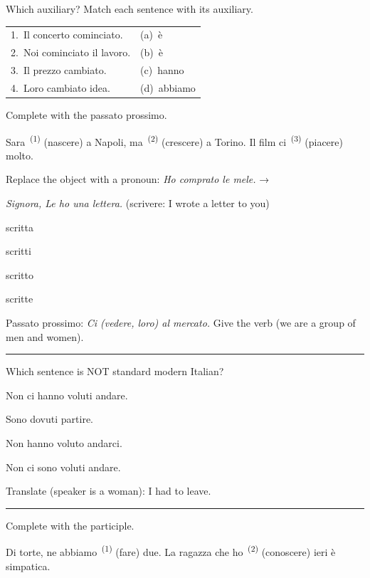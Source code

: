 \documentclass[11pt,a4paper,twoside,openright]{book}
\newcommand{\blank}{\underline{\hspace{2.6cm}}}
\newcommand{\clozeblank}[1]{\underline{\hspace{2.4cm}}\textsuperscript{\,(#1)}}
\newcommand{\answerline}{\par\vspace{6pt}\noindent\rule{0.75\linewidth}{0.4pt}\par}
\begin{document}
\begin{exercises}
\item\label{ex:ausiliari-accordo-1}\relax Which auxiliary? Match each sentence with its auxiliary.\par\smallskip\begin{tabularx}{\linewidth}{@{}L L@{}}
1.\ Il concerto \blank{} cominciato. & (a)\ è \\
2.\ Noi \blank{} cominciato il lavoro. & (b)\ è \\
3.\ Il prezzo \blank{} cambiato. & (c)\ hanno \\
4.\ Loro \blank{} cambiato idea. & (d)\ abbiamo \\
\end{tabularx}
\item\label{ex:ausiliari-accordo-2}\relax Complete with the passato prossimo.\par\smallskip\begingroup\setlength{\parindent}{0pt}Sara \clozeblank{1} (nascere) a Napoli, ma \clozeblank{2} (crescere) a Torino. Il film ci \clozeblank{3} (piacere) molto.\par\endgroup
\item\label{ex:ausiliari-accordo-3}\relax Replace the object with a pronoun: \textit{Ho comprato le mele.} → \blank{}
\item\label{ex:ausiliari-accordo-4}\relax \textit{Signora, Le ho \blank{} una lettera.} (scrivere: I wrote a letter to you)\par\nopagebreak\begin{options}
\item\relax scritta
\item\relax scritti
\item\relax scritto
\item\relax scritte
\end{options}
\item\label{ex:ausiliari-accordo-5}\relax Passato prossimo: \textit{Ci (vedere, loro) al mercato.} Give the verb (we are a group of men and women).\par\answerline
\item\label{ex:ausiliari-accordo-6}\relax Which sentence is NOT standard modern Italian?\par\nopagebreak\begin{options}
\item\relax Non ci hanno voluti andare.
\item\relax Sono dovuti partire.
\item\relax Non hanno voluto andarci.
\item\relax Non ci sono voluti andare.
\end{options}
\item\label{ex:ausiliari-accordo-7}\relax Translate (speaker is a woman): I had to leave.\par\answerline
\item\label{ex:ausiliari-accordo-8}\relax Complete with the participle.\par\smallskip\begingroup\setlength{\parindent}{0pt}Di torte, ne abbiamo \clozeblank{1} (fare) due. La ragazza che ho \clozeblank{2} (conoscere) ieri è simpatica.\par\endgroup
\end{exercises}
\end{document}
